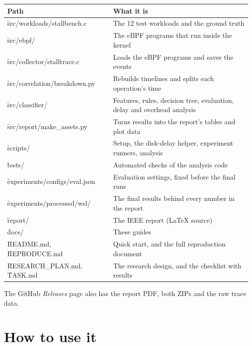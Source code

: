 \documentclass[11pt]{article}
\begin{document}
\begin{center}
\begin{tabularx}{\textwidth}{@{}lY@{}}
\toprule
Path & What it is \\
\midrule
\f{src/workloads/stallbench.c} & The 12 test workloads and the ground truth \\
\f{src/ebpf/} & The eBPF programs that run inside the kernel \\
\f{src/collector/stalltrace.c} & Loads the eBPF programs and saves the events \\
\f{src/correlation/breakdown.py} & Rebuilds timelines and splits each operation's time \\
\f{src/classifier/} & Features, rules, decision tree, evaluation, delay and overhead analysis \\
\f{src/report/make\_assets.py} & Turns results into the report's tables and plot data \\
\f{scripts/} & Setup, the disk-delay helper, experiment runners, analysis \\
\f{tests/} & Automated checks of the analysis code \\
\f{experiments/configs/eval.json} & Evaluation settings, fixed before the final runs \\
\f{experiments/processed/wsl/} & The final results behind every number in the report \\
\f{report/} & The IEEE report (LaTeX source) \\
\f{docs/} & These guides \\
\f{README.md}, \f{REPRODUCE.md} & Quick start, and the full reproduction document \\
\f{RESEARCH\_PLAN.md}, \f{TASK.md} & The research design, and the checklist with results \\
\bottomrule
\end{tabularx}
\end{center}

The GitHub \emph{Releases} page also has the report PDF, both ZIPs and the raw trace data.

\section{How to use it}
\end{document}
